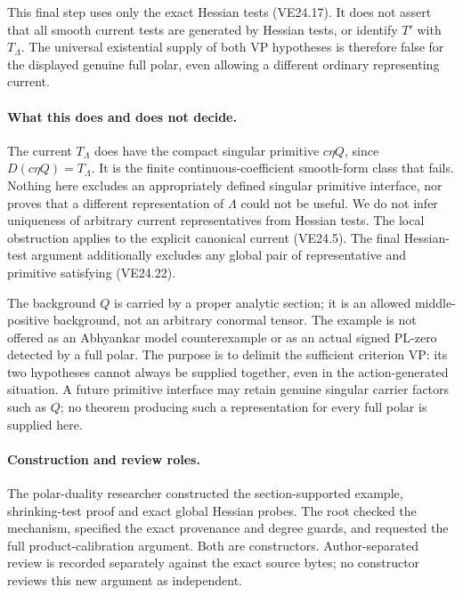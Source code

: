 This final step uses only the exact Hessian tests (VE24.17).
It does not assert that all smooth current tests are generated
by Hessian tests, or identify \(T'\) with \(T_\Lambda\).
The universal existential supply of both VP hypotheses is
therefore false for the displayed genuine full polar, even
allowing a different ordinary representing current.

\paragraph{What this does and does not decide.}
The current \(T_\Lambda\) does have the compact singular
primitive \(c\eta Q\), since \(D(c\eta Q)=T_\Lambda\).
It is the finite continuous-coefficient smooth-form class that
fails. Nothing here excludes an appropriately defined singular
primitive interface, nor proves that a different representation
of \(\Lambda\) could not be useful. We do not infer uniqueness
of arbitrary current representatives from Hessian tests.
The local obstruction applies to the explicit canonical current
(VE24.5). The final Hessian-test argument additionally excludes
any global pair of representative and primitive satisfying
(VE24.22).

The background \(Q\) is carried by a proper analytic section;
it is an allowed middle-positive background, not an arbitrary
conormal tensor. The example is not offered as an Abhyankar
model counterexample or as an actual signed PL-zero detected
by a full polar. The purpose is to delimit the sufficient
criterion VP: its two hypotheses cannot always be supplied
together, even in the action-generated situation. A future primitive interface may retain genuine
singular carrier factors such as \(Q\); no theorem producing
such a representation for every full polar is supplied here.

\paragraph{Construction and review roles.}
The polar-duality researcher constructed the section-supported
example, shrinking-test proof and exact global Hessian probes. The root checked the
mechanism, specified the exact provenance and degree guards,
and requested the full product-calibration argument. Both are
constructors. Author-separated review is recorded separately
against the exact source bytes; no constructor reviews this
new argument as independent.
